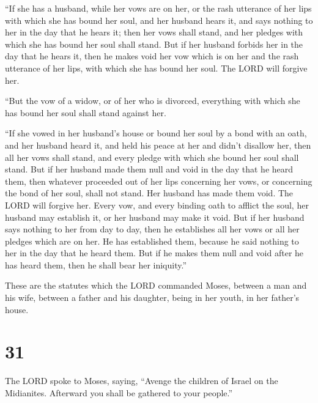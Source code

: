  ``If she has a husband, while her vows are on her, or the
rash utterance of her lips with which she has bound her soul,
 and her husband hears it, and says nothing to her in the
day that he hears it; then her vows shall stand, and her pledges with
which she has bound her soul shall stand.  But if her
husband forbids her in the day that he hears it, then he makes void her
vow which is on her and the rash utterance of her lips, with which she
has bound her soul. The LORD will forgive her.

 ``But the vow of a widow, or of her who is divorced,
everything with which she has bound her soul shall stand against her.

 ``If she vowed in her husband's house or bound her soul
by a bond with an oath,  and her husband heard it, and
held his peace at her and didn't disallow her, then all her vows shall
stand, and every pledge with which she bound her soul shall stand.
 But if her husband made them null and void in the day
that he heard them, then whatever proceeded out of her lips concerning
her vows, or concerning the bond of her soul, shall not stand. Her
husband has made them void. The LORD will forgive her. 
Every vow, and every binding oath to afflict the soul, her husband may
establish it, or her husband may make it void.  But if
her husband says nothing to her from day to day, then he establishes all
her vows or all her pledges which are on her. He has established them,
because he said nothing to her in the day that he heard them.
 But if he makes them null and void after he has heard
them, then he shall bear her iniquity.''

 These are the statutes which the LORD commanded Moses,
between a man and his wife, between a father and his daughter, being in
her youth, in her father's house.

\hypertarget{section-30}{%
\section{31}\label{section-30}}

 The LORD spoke to Moses, saying,  ``Avenge
the children of Israel on the Midianites. Afterward you shall be
gathered to your people.''

